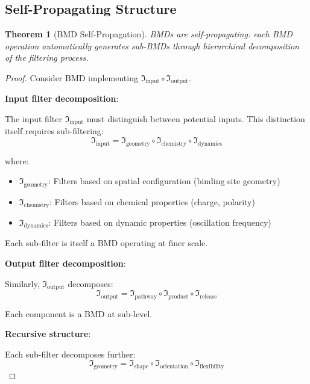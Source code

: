 \documentclass[12pt,a4paper]{article}
\newtheorem{theorem}{Theorem}
\begin{document}
\subsection{Self-Propagating Structure}

\begin{theorem}[BMD Self-Propagation]
\label{thm:bmd_self_propagation}
BMDs are self-propagating: each BMD operation automatically generates sub-BMDs through hierarchical decomposition of the filtering process.
\end{theorem}

\begin{proof}
Consider BMD implementing $\Im_{\text{input}} \circ \Im_{\text{output}}$.

\textbf{Input filter decomposition}:

The input filter $\Im_{\text{input}}$ must distinguish between potential inputs. This distinction itself requires sub-filtering:
\begin{equation}
\Im_{\text{input}} = \Im_{\text{geometry}} \circ \Im_{\text{chemistry}} \circ \Im_{\text{dynamics}}
\end{equation}

where:
\begin{itemize}
\item $\Im_{\text{geometry}}$: Filters based on spatial configuration (binding site geometry)
\item $\Im_{\text{chemistry}}$: Filters based on chemical properties (charge, polarity)
\item $\Im_{\text{dynamics}}$: Filters based on dynamic properties (oscillation frequency)
\end{itemize}

Each sub-filter is itself a BMD operating at finer scale.

\textbf{Output filter decomposition}:

Similarly, $\Im_{\text{output}}$ decomposes:
\begin{equation}
\Im_{\text{output}} = \Im_{\text{pathway}} \circ \Im_{\text{product}} \circ \Im_{\text{release}}
\end{equation}

Each component is a BMD at sub-level.

\textbf{Recursive structure}:

Each sub-filter decomposes further:
\begin{equation}
\Im_{\text{geometry}} = \Im_{\text{shape}} \circ \Im_{\text{orientation}} \circ \Im_{\text{flexibility}}
\end{equation}


\end{proof}
\end{document}
